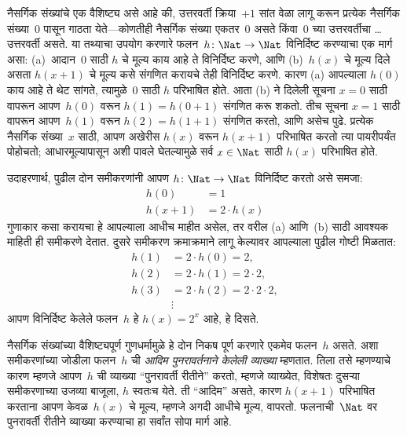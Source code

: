 \documentclass[../../../include/open-logic-section]{subfiles}
\begin{document}

नैसर्गिक संख्यांचे एक वैशिष्ट्य असे आहे की, उत्तरवर्ती क्रिया~$+1$
सांत वेळा लागू करून प्रत्येक नैसर्गिक संख्या~$0$ पासून गाठता येते---कोणतीही
नैसर्गिक संख्या एकतर~$0$ असते किंवा~$0$ च्या उत्तरवर्तीचा \dots{}
उत्तरवर्ती असते. या तथ्याचा उपयोग करणारे फलन~$h\colon\Nat \to \Nat$
विनिर्दिष्ट करण्याचा एक मार्ग असा: (a)~आदान~$0$ साठी $h$ चे मूल्य काय
आहे ते विनिर्दिष्ट करणे, आणि (b)~$h(x)$ चे मूल्य दिले असता $h(x+1)$ चे
मूल्य कसे संगणित करायचे तेही विनिर्दिष्ट करणे. कारण (a) आपल्याला
$h(0)$ काय आहे ते थेट सांगते, त्यामुळे~$0$ साठी $h$ परिभाषित होते.
आता (b) ने दिलेली सूचना $x=0$ साठी वापरून आपण~$h(0)$ वरून
$h(1) = h(0+1)$ संगणित करू शकतो. तीच सूचना $x=1$ साठी वापरून
आपण~$h(1)$ वरून $h(2) = h(1+1)$ संगणित करतो, आणि असेच पुढे.
प्रत्येक नैसर्गिक संख्या~$x$ साठी, आपण अखेरीस $h(x)$ वरून $h(x+1)$
परिभाषित करतो त्या पायरीपर्यंत पोहोचतो; आधारमूल्यापासून अशी पावले
घेतल्यामुळे सर्व $x \in \Nat$ साठी $h(x)$ परिभाषित होते.

उदाहरणार्थ, पुढील दोन समीकरणांनी आपण $h\colon \Nat \to \Nat$ विनिर्दिष्ट
करतो असे समजा:
\begin{align*}
h(0) & =  1\\
h(x+1) & =  2 \cdot h(x)
\end{align*}
गुणाकार कसा करायचा हे आपल्याला आधीच माहीत असेल, तर वरील (a) आणि~(b)
साठी आवश्यक माहिती ही समीकरणे देतात. दुसरे समीकरण क्रमाक्रमाने लागू
केल्यावर आपल्याला पुढील गोष्टी मिळतात:
\begin{align*}
  h(1) & = 2\cdot h(0) = 2,\\
  h(2) & = 2\cdot h(1) = 2\cdot 2,\\
  h(3) & = 2 \cdot h(2) = 2\cdot 2 \cdot 2,\\
  & \vdots
\end{align*}
आपण विनिर्दिष्ट केलेले फलन~$h$ हे $h(x) = 2^x$ आहे, हे दिसते.

नैसर्गिक संख्यांच्या वैशिष्ट्यपूर्ण गुणधर्मामुळे हे दोन निकष पूर्ण करणारे
एकमेव फलन~$h$ असते. अशा समीकरणांच्या जोडीला फलन~$h$ ची
\emph{आदिम पुनरावर्तनाने केलेली व्याख्या} म्हणतात. तिला तसे म्हणण्याचे
कारण म्हणजे आपण~$h$ ची व्याख्या ``पुनरावर्ती रीतीने'' करतो, म्हणजे
व्याख्येत, विशेषतः दुसऱ्या समीकरणाच्या उजव्या बाजूला, $h$ स्वतःच येते.
ती ``आदिम'' असते, कारण $h(x+1)$ परिभाषित करताना आपण केवळ~$h(x)$ चे
मूल्य, म्हणजे अगदी आधीचे मूल्य, वापरतो. फलनाची~$\Nat$ वर पुनरावर्ती
रीतीने व्याख्या करण्याचा हा सर्वांत सोपा मार्ग आहे.
\end{document}
